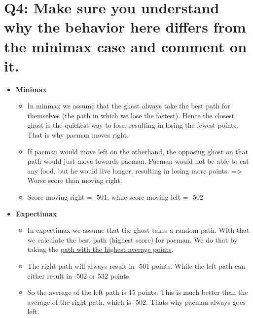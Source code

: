 \section{Q4: Make sure you understand why the behavior here differs from the minimax case and comment on it.}
\begin{itemize}
    \item \textbf{Minimax}
    \begin{itemize}
        \item In minmax we assume that the ghost always take the best path for themselves (the path in which we lose the fastest). Hence the closest ghost is the quickest way to lose, resulting in losing the fewest points. That is why pacman moves right.
        \item If pacman would move left on the otherhand, the opposing ghost on that path would just move towards pacman. Pacman would not be able to eat any food, but he would live longer, resulting in losing more points. => Worse score than moving right. 
        \item Score moving right = -501, while score moving left = -502
    \end{itemize}
    
    \item \textbf{Expectimax}
    \begin{itemize}
        \item In expectimax we assume that the ghost takes a random path. With that we calculate the best path (highest score) for pacman. We do that by taking the \underline{path with the highest average points}.
        \item The right path will always result in -501 points. While the left path can either result in -502 or 532 points.
        \item So the average of the left path is 15 points. This is much better than the average of the right path, which is -502. Thats why pacman always goes left.
    \end{itemize}

\end{itemize}

